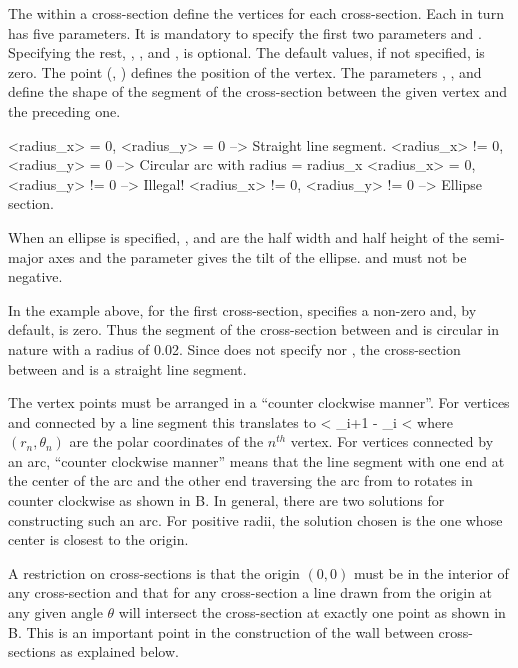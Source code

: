 The  within a cross-section define the vertices
for each cross-section. Each  in turn has five
parameters. It is mandatory to specify the first two parameters
 and . Specifying the rest, ,
, and , is optional. The default values, if
not specified, is zero. The point (, ) defines the
position of the vertex. The parameters ,
, and  define the shape of the segment of
the cross-section between the given vertex and the preceding one.
\begin{example}
  <radius_x>  = 0, <radius_y>  = 0   --> Straight line segment.
  <radius_x> != 0, <radius_y>  = 0   --> Circular arc with radius = radius_x
  <radius_x>  = 0, <radius_y> != 0   --> Illegal!
  <radius_x> != 0, <radius_y> != 0   --> Ellipse section.
\end{example}
When an ellipse is specified, , and  are
the half width and half height of the semi-major axes and the
 parameter gives the tilt of the ellipse. 
and  must not be negative.

In the example above, for the first cross-section, 
specifies a non-zero  and, by default, 
is zero. Thus the segment of the cross-section between  and
 is circular in nature with a radius of 0.02. Since 
does not specify  nor , the
cross-section between  and  is a straight line
segment.

The vertex points must be arranged in a ``counter clockwise manner''. 
For vertices  and  connected by a line segment
this translates to
 < \theta_{i+1} - \theta_{i} \pmod{2\pi} < \pi
\Endeq
where $(r_n, \theta_n)$ are the polar coordinates of the $n^{th}$
vertex. For vertices connected by an arc, ``counter clockwise manner''
means that the line segment with one end at the center of the arc and
the other end traversing the arc from  to 
rotates in counter clockwise as shown in
B. In general, there are two solutions for
constructing such an arc. For positive radii, the solution chosen is
the one whose center is closest to the origin.  

A restriction on cross-sections is that the origin $(0,0)$ must be in the
interior of any cross-section and that for any cross-section a line
drawn from the origin at any given angle $\theta$ will intersect the
cross-section at exactly one point as shown in
B. This is an important point in the
construction of the wall between cross-sections as explained
below.

